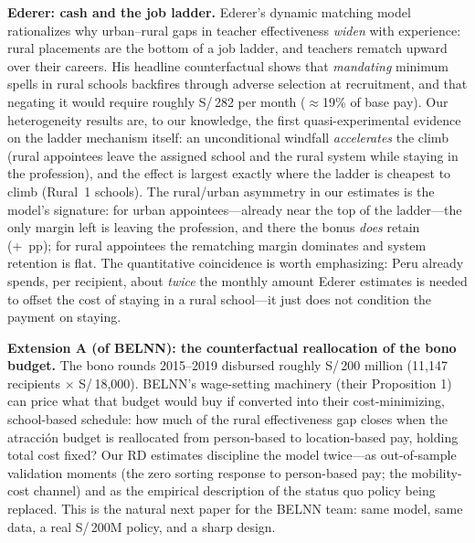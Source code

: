 \documentclass[11pt]{article}
\begin{document}
\textbf{Ederer: cash and the job ladder.} Ederer's dynamic matching model
rationalizes why urban--rural gaps in teacher effectiveness \emph{widen} with
experience: rural placements are the bottom of a job ladder, and teachers
rematch upward over their careers. His headline counterfactual shows that
\emph{mandating} minimum spells in rural schools backfires through adverse
selection at recruitment, and that negating it would require roughly
S/\,282 per month ($\approx$19\% of base pay). Our heterogeneity results are,
to our knowledge, the first quasi-experimental evidence on the ladder
mechanism itself: an unconditional windfall \emph{accelerates} the climb
(rural appointees leave the assigned school and the rural system while
staying in the profession), and the effect is largest exactly where the
ladder is cheapest to climb (Rural~1 schools). The rural/urban asymmetry in
our estimates is the model's signature: for urban appointees---already near
the top of the ladder---the only margin left is leaving the profession, and
there the bonus \emph{does} retain (+\UrbanRetainRF~pp); for rural appointees
the rematching margin dominates and system retention is flat. The
quantitative coincidence is worth emphasizing: Peru already spends, per
recipient, about \emph{twice} the monthly amount Ederer estimates is needed
to offset the cost of staying in a rural school---it just does not condition
the payment on staying.

\textbf{Extension A (of BELNN): the counterfactual reallocation of the bono
budget.} The bono rounds 2015--2019 disbursed roughly S/\,200 million
(11,147 recipients $\times$ S/\,18,000). BELNN's wage-setting machinery
(their Proposition 1) can price what that budget would buy if converted into
their cost-minimizing, school-based schedule: how much of the rural
effectiveness gap closes when the atracci\'on budget is reallocated from
person-based to location-based pay, holding total cost fixed? Our RD
estimates discipline the model twice---as out-of-sample validation moments
(the zero sorting response to person-based pay; the mobility-cost channel)
and as the empirical description of the status quo policy being replaced.
This is the natural next paper for the BELNN team: same model, same data, a
real S/\,200M policy, and a sharp design.
\end{document}
